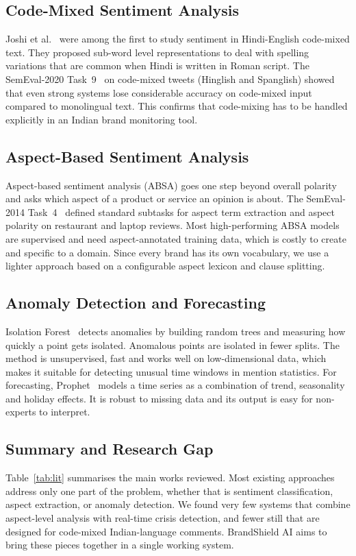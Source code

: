\documentclass[conference]{IEEEtran}
\begin{document}
\subsection{Code-Mixed Sentiment Analysis}
Joshi et al.~\cite{b4} were among the first to study sentiment in Hindi-English code-mixed text. They
proposed sub-word level representations to deal with spelling variations that are common when Hindi
is written in Roman script. The SemEval-2020 Task~9~\cite{b5} on code-mixed tweets (Hinglish and
Spanglish) showed that even strong systems lose considerable accuracy on code-mixed input compared to
monolingual text. This confirms that code-mixing has to be handled explicitly in an Indian brand
monitoring tool.

\subsection{Aspect-Based Sentiment Analysis}
Aspect-based sentiment analysis (ABSA) goes one step beyond overall polarity and asks which aspect of
a product or service an opinion is about. The SemEval-2014 Task~4~\cite{b6} defined standard subtasks
for aspect term extraction and aspect polarity on restaurant and laptop reviews. Most high-performing
ABSA models are supervised and need aspect-annotated training data, which is costly to create and
specific to a domain. Since every brand has its own vocabulary, we use a lighter approach based on a
configurable aspect lexicon and clause splitting.

\subsection{Anomaly Detection and Forecasting}
Isolation Forest~\cite{b7} detects anomalies by building random trees and measuring how quickly a
point gets isolated. Anomalous points are isolated in fewer splits. The method is unsupervised, fast
and works well on low-dimensional data, which makes it suitable for detecting unusual time windows
in mention statistics. For forecasting, Prophet~\cite{b8} models a time series as a combination of
trend, seasonality and holiday effects. It is robust to missing data and its output is easy for
non-experts to interpret.

\subsection{Summary and Research Gap}
Table~\ref{tab:lit} summarises the main works reviewed. Most existing approaches address only one
part of the problem, whether that is sentiment classification, aspect extraction, or anomaly
detection. We found very few systems that combine aspect-level analysis with real-time crisis
detection, and fewer still that are designed for code-mixed Indian-language comments. BrandShield AI
aims to bring these pieces together in a single working system.
\end{document}
